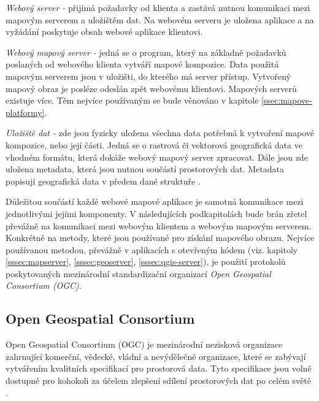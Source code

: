 \textit{Webový server -} přijímá požadavky od klienta a zastává nutnou
komunikaci mezi mapovým serverem a uložištěm dat. Na webovém serveru
je uložena aplikace a na vyžádání poskytuje obsah webové aplikace
klientovi.

\textit{Webový mapový server -} jedná se o program, který na základně
požadavků poslaných od webového klienta vytváří mapové kompozice. Data použitá mapovým serverem jsou v uložišti, do kterého má server přístup. Vytvořený mapový obraz je posléze odeslán zpět webovému klientovi. Mapových serverů existuje
více. Těm nejvíce používaným se bude věnováno v kapitole \ref{ssec:mapove-platformy}.

\textit{Uložiště dat -} zde jsou fyzicky uložena všechna data potřebná k
vytvoření mapové kompozice, nebo její části. Jedná se o rastrová či vektorová
geografická data ve vhodném formátu, která dokáže webový mapový server
zpracovat. Dále jsou zde uložena metadata, která jsou nutnou součástí
prostorových dat. Metadata popisují geografická data v předem dané struktuře \cite{web_mapping}.

Důležitou součástí každé webové mapové aplikace je samotná komunikace
mezi jednotlivými jejími komponenty. V následujících podkapitolách
bude brán zřetel převážně na komunikaci mezi webovým klientem a
webovým mapovým serverem. Konkrétně na metody, které jsou používané
pro získání mapového obrazu. Nejvíce používanou metodou, převážně v aplikacích s otevřeným kódem (viz. kapitoly \ref{sssec:mapserver}, \ref{sssec:geoserver}, \ref{sssec:qgis-server}), je použití protokolů poskytovaných mezinárodní standardizační organizací \textit{Open Geospatial Consortium (OGC)}.

\subsection{Open Geospatial Consortium}
\label{sssec:ogc}

Open Geospatial Consortium (OGC) je mezinárodní nezisková organizace
zahrnující komerční, vědecké, vládní a nevýdělečné organizace, které
se zabývají vytvářením kvalitních specifikací pro prostorová
data. Tyto specifikace jsou volně dostupné pro kohokoli za účelem
zlepšení sdílení prostorových dat po celém světě \cite{oqc_web}.


